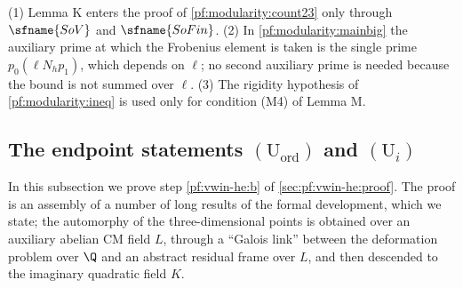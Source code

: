 \begin{remark}\label{pf:modularity:rem-count23}
(1) Lemma K enters the proof of \cref{pf:modularity:count23} only through $\sfname{SoV}$ and $\sfname{SoFin}$.
(2) In \cref{pf:modularity:mainbig} the auxiliary prime at which the Frobenius element is taken is the single prime
$p_0(\ell N_hp_1)$, which depends on $\ell$; no second auxiliary prime is needed because the bound is not summed over
$\ell$.
(3) The rigidity hypothesis of \cref{pf:modularity:ineq} is used only for condition (M4) of Lemma M.
\end{remark}

\subsection{The endpoint statements \texorpdfstring{$(\mathrm{U}_{\mathrm{ord}})$}{(U-ord)} and \texorpdfstring{$(\mathrm{U}_i)$}{(U-i)}}\label{sec:pf:modularity:ends}

In this subsection we prove step \ref{pf:vwin-he:b} of \cref{sec:pf:vwin-he:proof}. The proof is an assembly of a
number of long results of the formal development, which we state; the automorphy of the three-dimensional points is
obtained over an auxiliary abelian CM field $L$, through a ``Galois link'' between the deformation problem over $\Q$
and an abstract residual frame over $L$, and then descended to the imaginary quadratic field $K$.

